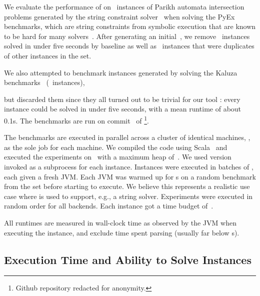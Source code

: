 
We evaluate the performance of \Catra{} on~\NrBenchmarks{} instances of Parikh
automata intersection problems generated by the \OstrichPlus{} string constraint
solver~\cite{ostrich-plus} when solving the PyEx benchmarks, 
which are string constraints from symbolic execution that are known
to be hard for many solvers~\cite{pyex}. After generating an
initial~\InitialNrBenchmarks{}, we remove~\NrTrivial{} instances solved in under
five seconds by baseline as well as~\NrInvalid{} instances that were duplicates of other instances in the set.

 We also attempted to benchmark instances generated by
\OstrichPlus{} solving the Kaluza benchmarks~\cite{Saxena10:kaluza}
(~instances),

but discarded them since they all turned out to be trivial for our tool
\Catra{}: every instance
could be solved in under five seconds, with a mean runtime of about 0.1s.
The benchmarks are run
on commit~\texttt{\commit} of \Catra{}\footnote{Github repository redacted for anonymity.}.

The benchmarks are executed in parallel across a cluster of identical
machines, \BenchmarkRig{}, as the sole job for each machine.  We compiled
the code using Scala~\ScalaVersion{} and executed the experiments
on~\JvmVersion{} with a maximum heap of~\MaxHeapSize{}. We used \Nuxmv{}
version~\NuxmvVersion{} invoked as a subprocess for each instance. Instances
were executed in batches of \BatchSize{}, each given a fresh JVM. Each JVM was
warmed up for s on a random benchmark from the set before starting
to execute. We believe this represents a realistic use case where \Calculus{} is
used to support, e.g., a string solver. Experiments were executed in random order
for all backends. Each instance got a time budget of~\RuntimeTimeout{}.

All runtimes are measured in wall-clock time as observed by the JVM when
executing the instance, and exclude time spent parsing (usually far below
s).

\subsection{Execution Time and Ability to Solve Instances}\label{sec:runtime}

